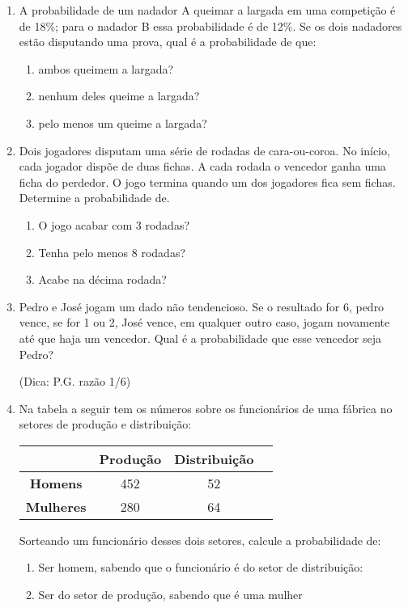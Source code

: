 \documentclass[twocolumn,oneside,a4paper,12pt]{article}
\begin{document}
\begin{enumerate}
\item A probabilidade de um nadador A queimar a largada em uma competição é de 18\%; para o nadador B essa probabilidade é de 12\%. Se os dois nadadores estão disputando uma prova, qual é a probabilidade de que:   
\begin{enumerate}
\item ambos queimem a largada?
\item nenhum deles queime a largada?
\item pelo menos um queime a largada? 
\end{enumerate}

\item Dois jogadores disputam uma série de rodadas de cara-ou-coroa. No início, cada jogador dispõe de duas fichas. A cada rodada o vencedor ganha uma ficha do perdedor. O jogo termina quando um dos jogadores fica sem fichas. Determine a probabilidade de.
\begin{enumerate}
\item O jogo acabar com 3 rodadas?
\item Tenha pelo menos 8 rodadas?
\item Acabe na décima rodada? 
\end{enumerate}

\item Pedro e José jogam um dado não tendencioso. Se o resultado for 6, pedro vence, se for 1 ou 2, José vence, em qualquer outro caso, jogam novamente até que haja um vencedor. Qual é a probabilidade que esse vencedor seja Pedro?

(Dica: P.G. razão 1/6)


\item Na tabela a seguir tem os números sobre os funcionários de uma fábrica no setores de produção e distribuição:

\begin{tabular}{cccc}
\hline
 & \textbf{Produção} & \textbf{Distribuição} \\ 
\hline
\textbf{Homens} & 452 & 52 \\ 
\textbf{Mulheres} & 280 & 64 \\ 
\hline
\end{tabular} 

Sorteando um funcionário desses dois setores, calcule a probabilidade de:

\begin{enumerate}
\item Ser homem, sabendo que o funcionário é do setor de distribuição:
\item Ser do setor de produção, sabendo que é uma mulher
\end{enumerate}


\end{enumerate}
\end{document}
